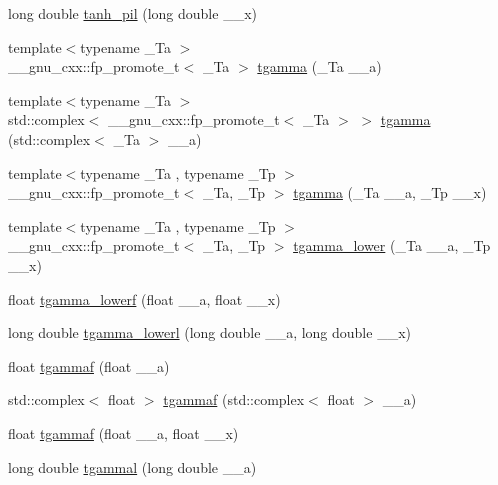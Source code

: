 \begin{DoxyCompactItemize}
\item 
long double \hyperlink{group__mathsf__gnu_ga4bc71ee5cf3df2ba35e6504027e5c6c6}{tanh\+\_\+pil} (long double \+\_\+\+\_\+x)
\item 
{\footnotesize template$<$typename \+\_\+\+Ta $>$ }\\\+\_\+\+\_\+gnu\+\_\+cxx\+::fp\+\_\+promote\+\_\+t$<$ \+\_\+\+Ta $>$ \hyperlink{group__mathsf__gnu_ga73a634663e4eceb1e6bcf3fc16773b7b}{tgamma} (\+\_\+\+Ta \+\_\+\+\_\+a)
\item 
{\footnotesize template$<$typename \+\_\+\+Ta $>$ }\\std\+::complex$<$ \+\_\+\+\_\+gnu\+\_\+cxx\+::fp\+\_\+promote\+\_\+t$<$ \+\_\+\+Ta $>$ $>$ \hyperlink{group__mathsf__gnu_gab01fe5b7f1bacdafcad5746ef50af777}{tgamma} (std\+::complex$<$ \+\_\+\+Ta $>$ \+\_\+\+\_\+a)
\item 
{\footnotesize template$<$typename \+\_\+\+Ta , typename \+\_\+\+Tp $>$ }\\\+\_\+\+\_\+gnu\+\_\+cxx\+::fp\+\_\+promote\+\_\+t$<$ \+\_\+\+Ta, \+\_\+\+Tp $>$ \hyperlink{group__mathsf__gnu_ga264207c0040cd3877fad455121da8518}{tgamma} (\+\_\+\+Ta \+\_\+\+\_\+a, \+\_\+\+Tp \+\_\+\+\_\+x)
\item 
{\footnotesize template$<$typename \+\_\+\+Ta , typename \+\_\+\+Tp $>$ }\\\+\_\+\+\_\+gnu\+\_\+cxx\+::fp\+\_\+promote\+\_\+t$<$ \+\_\+\+Ta, \+\_\+\+Tp $>$ \hyperlink{group__mathsf__gnu_gaed107908dec8865ea48e7764f7ea88a2}{tgamma\+\_\+lower} (\+\_\+\+Ta \+\_\+\+\_\+a, \+\_\+\+Tp \+\_\+\+\_\+x)
\item 
float \hyperlink{group__mathsf__gnu_ga8f2aabeaa29d21b19c43972efb26798c}{tgamma\+\_\+lowerf} (float \+\_\+\+\_\+a, float \+\_\+\+\_\+x)
\item 
long double \hyperlink{group__mathsf__gnu_gad057fe49a5bf95b1550f5f0a6e60bb19}{tgamma\+\_\+lowerl} (long double \+\_\+\+\_\+a, long double \+\_\+\+\_\+x)
\item 
float \hyperlink{group__mathsf__gnu_ga008b1f4cc3a54c9c8221ad1f3504b593}{tgammaf} (float \+\_\+\+\_\+a)
\item 
std\+::complex$<$ float $>$ \hyperlink{group__mathsf__gnu_gaf548b80db1501cbc067de1564e721972}{tgammaf} (std\+::complex$<$ float $>$ \+\_\+\+\_\+a)
\item 
float \hyperlink{group__mathsf__gnu_ga942773871e9c21a50cf13ec160e7e8d9}{tgammaf} (float \+\_\+\+\_\+a, float \+\_\+\+\_\+x)
\item 
long double \hyperlink{group__mathsf__gnu_ga2c7d954852d84665aabd43566d67e344}{tgammal} (long double \+\_\+\+\_\+a)

\end{DoxyCompactItemize}
